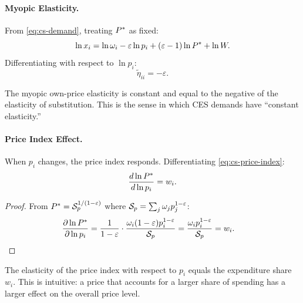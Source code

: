 \paragraph{Myopic Elasticity.}

From \eqref{eq:cs-demand}, treating $P^{*}$ as fixed:
\begin{equation}
\ln x_i = \ln \omega_i - \varepsilon \ln p_i + (\varepsilon - 1) \ln P^{*} + \ln W.
\end{equation}
Differentiating with respect to $\ln p_i$:
\begin{equation}
\label{eq:myopic-own}
\tilde{\eta}_{ii} = -\varepsilon.
\end{equation}

The myopic own-price elasticity is constant and equal to the negative of the elasticity of substitution. This is the sense in which CES demands have ``constant elasticity.''

\paragraph{Price Index Effect.}

When $p_i$ changes, the price index responds. Differentiating \eqref{eq:cs-price-index}:
\begin{equation}
\label{eq:dP-dp}
\frac{d \ln P^{*}}{d \ln p_i} = w_i.
\end{equation}

\begin{proof}
From $P^{*} = \mathcal{S}_p^{1/(1-\varepsilon)}$ where $\mathcal{S}_p = \sum_j \omega_j p_j^{1-\varepsilon}$:
\begin{align*}
\frac{\partial \ln P^{*}}{\partial \ln p_i} &= \frac{1}{1-\varepsilon} \cdot \frac{\omega_i (1-\varepsilon) p_i^{1-\varepsilon}}{\mathcal{S}_p} = \frac{\omega_i p_i^{1-\varepsilon}}{\mathcal{S}_p} = w_i.
\end{align*}
\end{proof}

The elasticity of the price index with respect to $p_i$ equals the expenditure share $w_i$. This is intuitive: a price that accounts for a larger share of spending has a larger effect on the overall price level.

